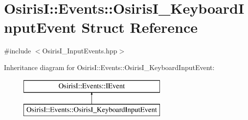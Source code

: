 \hypertarget{struct_osiris_i_1_1_events_1_1_osiris_i___keyboard_input_event}{\section{Osiris\-I\-:\-:Events\-:\-:Osiris\-I\-\_\-\-Keyboard\-Input\-Event Struct Reference}
\label{struct_osiris_i_1_1_events_1_1_osiris_i___keyboard_input_event}
}


{\ttfamily \#include $<$Osiris\-I\-\_\-\-Input\-Events.\-hpp$>$}

Inheritance diagram for Osiris\-I\-:\-:Events\-:\-:Osiris\-I\-\_\-\-Keyboard\-Input\-Event\-:\begin{figure}[H]
\begin{center}
\leavevmode
\includegraphics[height=2.000000cm]{struct_osiris_i_1_1_events_1_1_osiris_i___keyboard_input_event}
\end{center}
\end{figure}
